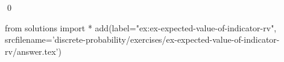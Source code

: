 
\begin{ex} 
  \label{ex:ex-expected-value-of-indicator-rv}
  
  \qed
\end{ex} 
\begin{python0}
from solutions import *
add(label="ex:ex-expected-value-of-indicator-rv",
    srcfilename='discrete-probability/exercises/ex-expected-value-of-indicator-rv/answer.tex') 
\end{python0}
